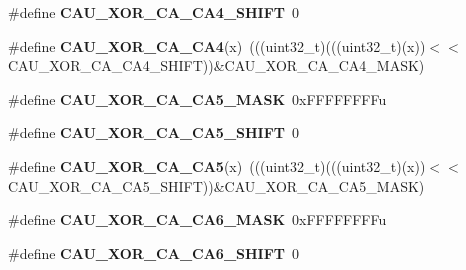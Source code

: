 \begin{DoxyCompactItemize}
\item 
\#define {\bfseries C\+A\+U\+\_\+\+X\+O\+R\+\_\+\+C\+A\+\_\+\+C\+A4\+\_\+\+S\+H\+I\+FT}~0\hypertarget{group__CAU__Register__Masks_gad185523c9ec94202cae6663e3a76423f}{}\label{group__CAU__Register__Masks_gad185523c9ec94202cae6663e3a76423f}

\item 
\#define {\bfseries C\+A\+U\+\_\+\+X\+O\+R\+\_\+\+C\+A\+\_\+\+C\+A4}(x)~(((uint32\+\_\+t)(((uint32\+\_\+t)(x))$<$$<$C\+A\+U\+\_\+\+X\+O\+R\+\_\+\+C\+A\+\_\+\+C\+A4\+\_\+\+S\+H\+I\+FT))\&C\+A\+U\+\_\+\+X\+O\+R\+\_\+\+C\+A\+\_\+\+C\+A4\+\_\+\+M\+A\+SK)\hypertarget{group__CAU__Register__Masks_ga76d51795ea5635a4804f5b7ef4e4155c}{}\label{group__CAU__Register__Masks_ga76d51795ea5635a4804f5b7ef4e4155c}

\item 
\#define {\bfseries C\+A\+U\+\_\+\+X\+O\+R\+\_\+\+C\+A\+\_\+\+C\+A5\+\_\+\+M\+A\+SK}~0x\+F\+F\+F\+F\+F\+F\+F\+Fu\hypertarget{group__CAU__Register__Masks_ga74cbc0141ce46b620019e18b8eb2f908}{}\label{group__CAU__Register__Masks_ga74cbc0141ce46b620019e18b8eb2f908}

\item 
\#define {\bfseries C\+A\+U\+\_\+\+X\+O\+R\+\_\+\+C\+A\+\_\+\+C\+A5\+\_\+\+S\+H\+I\+FT}~0\hypertarget{group__CAU__Register__Masks_ga524e70cc275f9e2d963db75ea6dace92}{}\label{group__CAU__Register__Masks_ga524e70cc275f9e2d963db75ea6dace92}

\item 
\#define {\bfseries C\+A\+U\+\_\+\+X\+O\+R\+\_\+\+C\+A\+\_\+\+C\+A5}(x)~(((uint32\+\_\+t)(((uint32\+\_\+t)(x))$<$$<$C\+A\+U\+\_\+\+X\+O\+R\+\_\+\+C\+A\+\_\+\+C\+A5\+\_\+\+S\+H\+I\+FT))\&C\+A\+U\+\_\+\+X\+O\+R\+\_\+\+C\+A\+\_\+\+C\+A5\+\_\+\+M\+A\+SK)\hypertarget{group__CAU__Register__Masks_gaa6543e7a0b9ab892dc327821a6357973}{}\label{group__CAU__Register__Masks_gaa6543e7a0b9ab892dc327821a6357973}

\item 
\#define {\bfseries C\+A\+U\+\_\+\+X\+O\+R\+\_\+\+C\+A\+\_\+\+C\+A6\+\_\+\+M\+A\+SK}~0x\+F\+F\+F\+F\+F\+F\+F\+Fu\hypertarget{group__CAU__Register__Masks_ga6b422fcb6666aa9f5c25894082aa81d8}{}\label{group__CAU__Register__Masks_ga6b422fcb6666aa9f5c25894082aa81d8}

\item 
\#define {\bfseries C\+A\+U\+\_\+\+X\+O\+R\+\_\+\+C\+A\+\_\+\+C\+A6\+\_\+\+S\+H\+I\+FT}~0\hypertarget{group__CAU__Register__Masks_gadf7fdd8eaf9822fec5ac691246d95683}{}\label{group__CAU__Register__Masks_gadf7fdd8eaf9822fec5ac691246d95683}


\end{DoxyCompactItemize}
